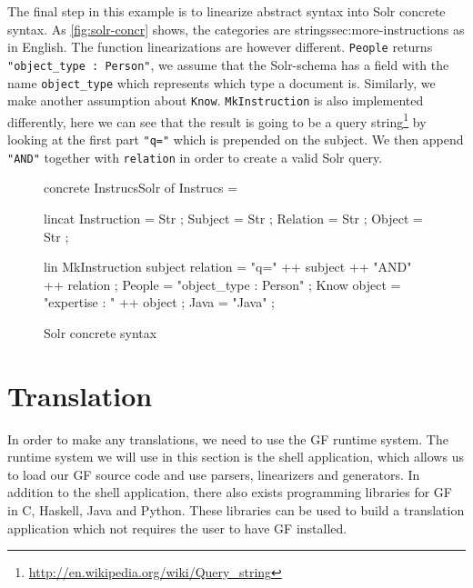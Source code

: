 
The final step in this example is to linearize abstract syntax into Solr concrete syntax.
  As \autoref{fig:solr-concr} shows, the categories are strings{sec:more-instructions} as in English. The function linearizations are however
  different. \texttt{People} returns 
  \texttt{"object\_type : Person"}, we assume that 
  the Solr-schema has a field with the name \texttt{object\_type} which represents 
  which type a document is. Similarly, we make another assumption about \texttt{Know}. \texttt{MkInstruction} is also implemented differently, here we can see that the result is going to be a query string\footnote{\url{http://en.wikipedia.org/wiki/Query\_string}} by looking at the first part \texttt{"q="} which is prepended on the subject. We then append \texttt{"AND"} together with \texttt{relation} in order to create a valid Solr query.

\begin{figure}[h]
\begin{code}
concrete InstrucsSolr of Instrucs = {
    lincat
      Instruction = Str ;
      Subject = Str ;
      Relation = Str ;
      Object = Str ;

    lin
      MkInstruction subject relation = "q=" ++ subject ++ "AND" ++ relation ;
      People = "object_type : Person" ;
      Know object = "expertise : " ++ object ;
      Java = "Java" ;
}
\end{code}
\caption{Solr concrete syntax\label{fig:solr-concr}}
\end{figure}

\section{Translation}

In order to make any translations, we need to use the GF runtime system. The  runtime system we will use in this section is the shell application, which allows us to load our GF source code and use parsers, linearizers and generators. In addition to the shell application, there also exists programming libraries for GF in C, Haskell, Java and Python. These libraries can be used to build a translation application which not requires the user to have GF installed.


